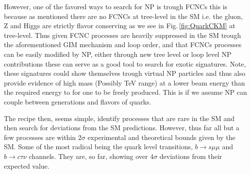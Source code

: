 \documentclass[10pt]{book}
\renewcommand{\(}{\left(}
\renewcommand{\)}{\right)}
\renewcommand{\[}{\left[}
\renewcommand{\]}{\right]}
\begin{document}
However, one of the favored ways to search for NP is trough FCNCs this is because as mentioned there are no FCNCs at tree-level in the SM i.e. the gluon, Z and Higgs are strictly flavor conserving as we see in Fig.\,\ref{fig:QuarkCKM} at tree-level.  
%
Thus given FCNC processes are heavily suppressed in the SM trough the aforementioned GIM mechanism and loop order, and that FCNCs processes can be easily modified by NP, either through new tree level or loop level NP contributions these can serve as a good tool to search for exotic signatures. 
%
Note, these signatures could show themselves trough virtual NP particles and thus also provide evidence of high mass (Possibly TeV range) at a lower beam energy than the required energy to for one to be freely produced. 
%
This is if we assume NP can couple between generations and flavors of quarks. 



The recipe then, seems simple, identify processes that are rare in the SM and then search for deviations from the SM predictions.
%
However, thus far all but a few processes are within $2\sigma$ experimental and theoretical bounds given by the SM. 
%
Some of the most radical being the quark level transitions, $b \rightarrow s \mu \mu$ \cite{DAmico2017}%
 and $b \rightarrow c \tau \nu$ \cite{Hu2019} channels. %
%
They are, so far, showing over $ 4 \sigma$ deviations from their expected value. 
\end{document}
